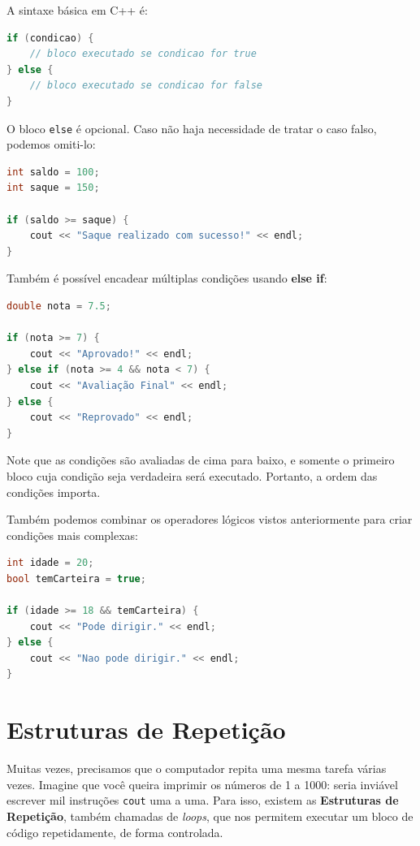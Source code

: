 \documentclass[12pt]{article}
\begin{document}
A sintaxe básica em C++ é:

\begin{lstlisting}[language=C++]
if (condicao) {
    // bloco executado se condicao for true
} else {
    // bloco executado se condicao for false
}
\end{lstlisting}

O bloco \texttt{else} é opcional. Caso não haja necessidade de tratar o caso falso, podemos omiti-lo:

\begin{lstlisting}[language=C++]
int saldo = 100;
int saque = 150;

if (saldo >= saque) {
    cout << "Saque realizado com sucesso!" << endl;
}
\end{lstlisting}

Também é possível encadear múltiplas condições usando \textbf{else if}:

\begin{lstlisting}[language=C++]
double nota = 7.5;

if (nota >= 7) {
    cout << "Aprovado!" << endl;
} else if (nota >= 4 && nota < 7) {
    cout << "Avaliação Final" << endl;
} else {
    cout << "Reprovado" << endl;
}
\end{lstlisting}

Note que as condições são avaliadas de cima para baixo, e somente o primeiro bloco cuja condição seja verdadeira será executado. Portanto, a ordem das condições importa.

Também podemos combinar os operadores lógicos vistos anteriormente para criar condições mais complexas:

\begin{lstlisting}[language=C++]
int idade = 20;
bool temCarteira = true;

if (idade >= 18 && temCarteira) {
    cout << "Pode dirigir." << endl;
} else {
    cout << "Nao pode dirigir." << endl;
}
\end{lstlisting}


\section{Estruturas de Repetição}
Muitas vezes, precisamos que o computador repita uma mesma tarefa várias vezes. Imagine que você queira imprimir os números de 1 a 1000: seria inviável escrever mil instruções \texttt{cout} uma a uma. Para isso, existem as \textbf{Estruturas de Repetição}, também chamadas de \textit{loops}, que nos permitem executar um bloco de código repetidamente, de forma controlada.
\end{document}
